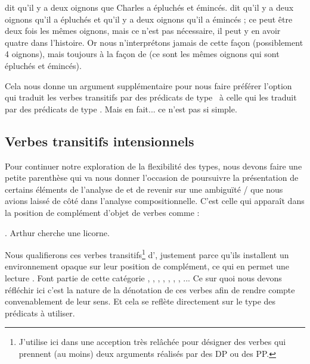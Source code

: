 \Last[b] dit qu'il y a deux oignons que Charles a épluchés et émincés.  \Last[c] dit qu'il y a deux oignons qu'il a épluchés et qu'il y a deux oignons qu'il a émincés ; ce peut être deux fois les mêmes oignons, mais ce n'est pas nécessaire, il peut y en avoir quatre dans l'histoire.  Or nous n'interprétons jamais \Last[a] de cette façon (possiblement 4 oignons), mais toujours à la façon de \Last[b] (ce sont les mêmes oignons qui sont épluchés et émincés).

Cela nous donne un argument supplémentaire pour nous faire préférer l'option qui traduit les verbes transitifs par des prédicats de type \eet\ à celle qui les traduit par des prédicats de type \type{\ett,\et}. Mais en fait... ce n'est pas si simple.





\subsection{Verbes transitifs intensionnels}
\label{ss:VTinten}

Pour  continuer notre exploration de la flexibilité des types,  nous devons faire une petite parenthèse qui va nous donner l'occasion de poursuivre la présentation de certains éléments de l'analyse de \citet{PTQ} et de revenir sur une ambiguïté / que nous avions laissé de côté dans l'analyse compositionnelle.  C'est celle qui apparaît dans la position de complément d'objet de verbes comme  :

\ex.
Arthur cherche une licorne. \label{x:Licorne1}


\sloppy

Nous qualifierons ces verbes transitifs\footnote{J'utilise ici  dans une acception très relâchée pour désigner des verbes qui prennent (au moins) deux arguments réalisés par des DP ou des PP.} d', justement parce qu'ils installent un environnement opaque  sur leur position de complément, ce qui en permet une lecture .
Font partie de cette catégorie 
,
,
,
,
,
,
,
...
Ce sur quoi nous devons réfléchir ici c'est la nature de la dénotation de ces verbes afin de rendre compte convenablement de leur sens.  Et cela se reflète directement sur le type des prédicats à utiliser.



